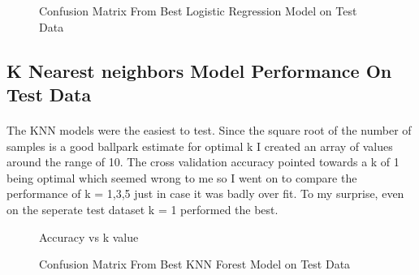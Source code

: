 \documentclass{article}
\begin{document}
    \begin{figure}[H]
      \centering
      \caption{Confusion Matrix From Best Logistic Regression Model on Test Data}
    \end{figure}
\subsection{K Nearest neighbors Model Performance On Test Data}
\paragraph{}
    The KNN models were the easiest to test. Since the square root of the number of samples is a good ballpark estimate for optimal k I created an array of values around the range of 10. The cross validation accuracy pointed towards a k of 1 being optimal which seemed wrong to me so I went on to compare the performance of k = 1,3,5 just in case it was badly over fit. To my surprise, even on the seperate test dataset k = 1 performed the best.
    \begin{figure}[H]
      \centering
      \caption{Accuracy vs k value}
    \end{figure}
    \begin{figure}[H]
      \centering
      \caption{Confusion Matrix From Best KNN Forest Model on Test Data}
    \end{figure}
\end{document}
